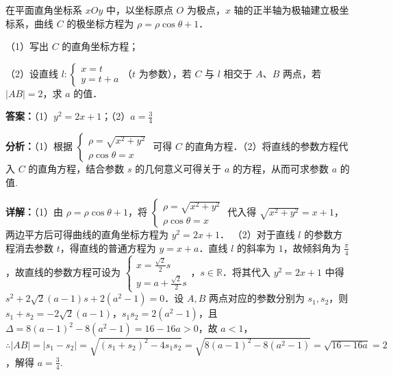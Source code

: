 \begin{question}[points=10]
在平面直角坐标系 $xOy$ 中，以坐标原点 $O$ 为极点，$x$ 轴的正半轴为极轴建立极坐标系，曲线 $C$ 的极坐标方程为 $\rho = \rho \cos \theta + 1$．

（1）写出 $C$ 的直角坐标方程；

（2）设直线 $l: \begin{cases} x = t \\ y = t + a \end{cases}$（$t$ 为参数），若 $C$ 与 $l$ 相交于 $A$、$B$ 两点，若 $|AB| = 2$，求 $a$ 的值．
\begin{solution}
\textbf{答案：}（1）$y^2 = 2x + 1$；（2）$a = \frac{3}{4}$

\textbf{分析：}（1）根据 $\begin{cases} \rho = \sqrt{x^2 + y^2} \\ \rho \cos \theta = x \end{cases}$ 可得 $C$ 的直角方程．（2）将直线的参数方程代入 $C$ 的直角方程，结合参数 $s$ 的几何意义可得关于 $a$ 的方程，从而可求参数 $a$ 的值.

\textbf{详解：}（1）由 $\rho = \rho \cos \theta + 1$，将 $\begin{cases} \rho = \sqrt{x^2 + y^2} \\ \rho \cos \theta = x \end{cases}$ 代入得 $\sqrt{x^2 + y^2} = x + 1$，两边平方后可得曲线的直角坐标方程为 $y^2 = 2x + 1$．
（2）对于直线 $l$ 的参数方程消去参数 $t$，得直线的普通方程为 $y = x + a$．直线 $l$ 的斜率为 $1$，故倾斜角为 $\frac{\pi}{4}$，故直线的参数方程可设为 $\begin{cases} x = \frac{\sqrt{2}}{2}s \\ y = a + \frac{\sqrt{2}}{2}s \end{cases}$，$s \in \mathbb{R}$．将其代入 $y^2 = 2x + 1$ 中得 $s^2 + 2\sqrt{2}(a-1)s + 2(a^2 - 1) = 0$．设 $A, B$ 两点对应的参数分别为 $s_1, s_2$，则 $s_1 + s_2 = -2\sqrt{2}(a-1)$，$s_1 s_2 = 2(a^2 - 1)$，且 $\Delta = 8(a-1)^2 - 8(a^2 - 1) = 16 - 16a > 0$，故 $a < 1$，$\therefore |AB| = |s_1 - s_2| = \sqrt{(s_1 + s_2)^2 - 4s_1 s_2} = \sqrt{8(a-1)^2 - 8(a^2 - 1)} = \sqrt{16 - 16a} = 2$，解得 $a = \frac{3}{4}$.
\end{solution}
\end{question}

